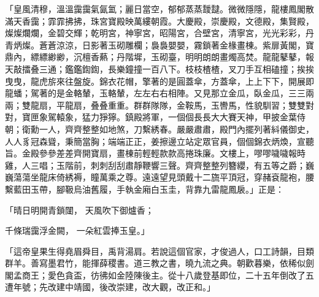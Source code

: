 「皇風清穆，溫溫靄靄氣氤氳；麗日當空，郁郁蒸蒸靉靆。微微隱隱，龍樓鳳閣散滿天香靄；霏霏拂拂，珠宮寶殿映萬縷朝霞。大慶殿，崇慶殿，文德殿，集賢殿，燦燦爛爛，金碧交輝；乾明宮，神寧宮，昭陽宮，合壁宮，清寧宮，光光彩彩，丹青炳燦。蒼蒼涼涼，日影著玉砌雕欄；裊裊嬰嬰，霧鎖著金椽畫棟。紫扉黃閣，寶鼎內，縹縹緲緲，沉檀香爇；丹階墀，玉砌臺，明明朗朗畫燭高焚。龍龍鼕鼕，報天敲擂叠三通；鑑鑑鍧鍧，長樂鐘撞一百八下。枝枝楂楂，叉刀手互相磕撞；挨挨曳曳，龍虎旂來往盤旋。錦衣花帽，擎著的是圓蓋傘，方蓋傘，上上下下，開展即龍蟠；駕著的是金輅輦，玉輅輦，左左右右相陣。又見那立金瓜，臥金瓜，三三兩兩；雙龍扇，平龍扇，叠叠重重。群群隊隊，金鞍馬，玉轡馬，性貌馴習；雙雙對對，寶匣象駕轅象，猛力猙獰。鎮殿將軍，一個個長長大大賽天神，甲披金葉侍朝；衛勳一人，齊齊整整如地煞，刀繫綉春。嚴嚴肅肅，殿門內擺列著紏儀御史，人人豸冠森聳，秉簡當胸；端端正正，姜擦邊立站定眾官員，個個錦衣炳煥，宣聽旨。金殿參參差差齊開寶扇，畫棟前輕輕款款高捲珠廉。文樓上，嘐嘐噦噦報時雞，人三唱；玉階前，刺刺刮刮肅靜鞭響三聲。齊齊整整列簪纓，有五等之爵；巍巍蕩蕩坐龍床倚綉褥，瞳萬乘之尊。遠遠望見頭戴十二旒平頂冠，穿赭袞龍袍，腰繫藍田玉帶，腳靸烏油舊履，手執金廂白玉圭，背靠九雷龍鳳扆。」正是：

「晴日明開青鎖闥，  天風吹下御爐香；

千條瑞靄浮金闕，  一朵紅雲捧玉皇。」

「這帝皇果生得堯眉舜目，禹背湯肩。若說這個官家，才俊過人，口工詩韻，目類群羊。善寫墨君竹，能揮薛稷書。道三教之書，曉九流之典。朝歡暮樂，依稀似劍閣孟商王；愛色貪盃，彷彿如金陸陳後主。從十八歲登基即位，二十五年倒改了五遭年號；先改建中靖國，後改崇建，改大觀，改正和。」

